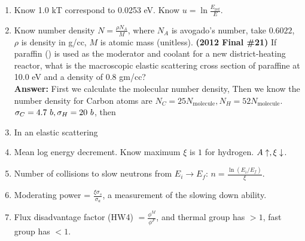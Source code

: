 \documentclass{school-22.211-notes}
\date{March 14, 2012}
\begin{document}
\maketitle

\begin{enumerate}
\item Know 1.0 kT correspond to 0.0253 eV. Know $\displaystyle u = \ln \frac{E_{\mathrm{ref}}}{E}$. 

\item Know number density $\displaystyle N = \frac{\rho N_A}{M}$, where $N_A$ is  avogado's number, take $0.6022$, $\rho$ is density in g/cc, $M$ is atomic mass (unitless). 
\textbf{(2012 Final \#21)} If paraffin () is used as the moderator and coolant for a new district-heating reactor, what is the macroscopic elastic scattering cross section of paraffine at 10.0 eV and a density of 0.8 gm/cc? \\
\textbf{Answer:} First we calculate the molecular number density, 
Then we know the number density for Carbon atoms are $N_C = 25 N_{\mathrm{molecule}}, N_H = 52 N_{\mathrm{molecule}}$. $\sigma_C = 4.7 \mbox{ } b, \sigma_H = 20 \mbox{ } b$, then

\item In an elastic scattering

\item Mean log energy decrement. Know maximum $\xi$ is $1$ for hydrogen. $A \uparrow, \xi \downarrow$. 

\item Number of collisions to slow neutrons from $E_i \to E_f$: $\displaystyle n = \frac{ \ln (E_i/E_f)}{\xi}$. 

\item Moderating power = $\frac{\xi \sigma_s}{\sigma_a}$, a measurement of the slowing down ability. 

\item Flux disadvantage factor (HW4) $\displaystyle = \frac{\phi^M}{\phi^F}$, and thermal group has $>1$, fast group has $<1$. 


\end{enumerate}
\end{document}
